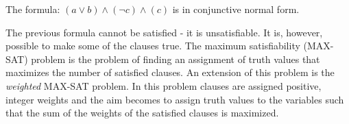 \begin{example}
The formula: $(a \lor b) \land (\lnot c) \land (c)$ is in conjunctive normal form.
\end{example}

The previous formula cannot be satisfied - it is unsatisfiable.
It is, however, possible to make some of the clauses true.
The maximum satisfiability (MAX-SAT) problem is the problem of finding an assignment of truth values that maximizes the number of satisfied clauses.
An extension of this problem is the \emph{weighted} MAX-SAT problem.
In this problem clauses are assigned positive, integer weights and the aim becomes to assign truth values to the variables such that the sum of the weights of the satisfied clauses is maximized.